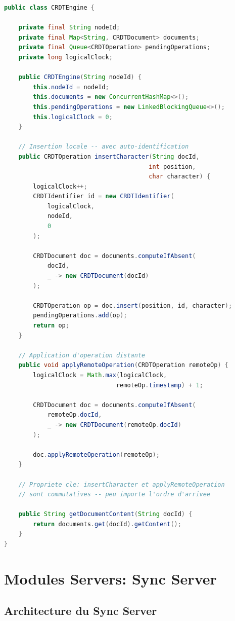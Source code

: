 \documentclass[11pt,a4paper,hidelinks]{book}
\begin{document}
\begin{lstlisting}[language=Java, caption={Squelette du CRDTEngine}]
public class CRDTEngine {
    
    private final String nodeId;
    private final Map<String, CRDTDocument> documents;
    private final Queue<CRDTOperation> pendingOperations;
    private long logicalClock;
    
    public CRDTEngine(String nodeId) {
        this.nodeId = nodeId;
        this.documents = new ConcurrentHashMap<>();
        this.pendingOperations = new LinkedBlockingQueue<>();
        this.logicalClock = 0;
    }
    
    // Insertion locale -- avec auto-identification
    public CRDTOperation insertCharacter(String docId, 
                                        int position, 
                                        char character) {
        logicalClock++;
        CRDTIdentifier id = new CRDTIdentifier(
            logicalClock,
            nodeId,
            0
        );
        
        CRDTDocument doc = documents.computeIfAbsent(
            docId,
            _ -> new CRDTDocument(docId)
        );
        
        CRDTOperation op = doc.insert(position, id, character);
        pendingOperations.add(op);
        return op;
    }
    
    // Application d'operation distante
    public void applyRemoteOperation(CRDTOperation remoteOp) {
        logicalClock = Math.max(logicalClock, 
                               remoteOp.timestamp) + 1;
        
        CRDTDocument doc = documents.computeIfAbsent(
            remoteOp.docId,
            _ -> new CRDTDocument(remoteOp.docId)
        );
        
        doc.applyRemoteOperation(remoteOp);
    }
    
    // Propriete cle: insertCharacter et applyRemoteOperation
    // sont commutatives -- peu importe l'ordre d'arrivee
    
    public String getDocumentContent(String docId) {
        return documents.get(docId).getContent();
    }
}
\end{lstlisting}

\section{Modules Servers: Sync Server}

\subsection{Architecture du Sync Server}
\end{document}
